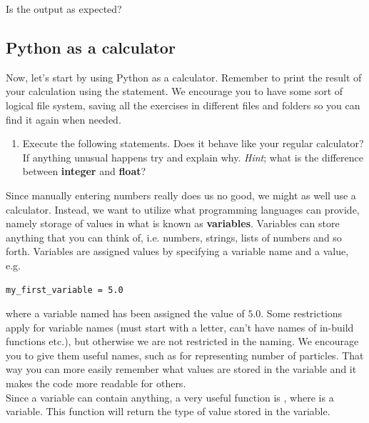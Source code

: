 \documentclass{article}
\begin{document}
Is the output as expected? 

\subsection{Python as a calculator}


Now, let's start by using Python as a calculator.
Remember to print the result of your calculation using the  statement.
We encourage you to have some sort of logical file system, saving all the exercises in
different files and folders so you can find it again when needed.

\begin{enumerate}
    \item Execute the following statements. Does it behave like your regular
    calculator? If anything unusual happens try and explain why.
    {\em Hint}; what is the difference between {\bf integer} and {\bf float}?

    \begin{centering}
    \end{centering}
\end{enumerate}

Since manually entering numbers really does us no good, we might as well use a
calculator. Instead, we want to utilize what programming languages can provide,
namely storage of values in what is known as {\bf variables}. Variables can store
anything that you can think of, i.e. numbers, strings, lists of numbers and so
forth. Variables are assigned values by specifying a variable name and a value, e.g.

\begin{lstlisting}
my_first_variable = 5.0
\end{lstlisting}

where a variable named  has been assigned the value
of $5.0$.
Some restrictions apply for variable names (must start with a letter, can't have names of
in-build functions etc.), but otherwise we are not restricted in the naming. We encourage you to give
them useful names, such as  for representing number of
particles. That way you can more easily remember what values are stored in the variable
and it makes the code more readable for others.\\

Since a variable can contain anything, a very useful function is ,
where  is a variable. This function will return the type of value stored
in the variable.
\end{document}
